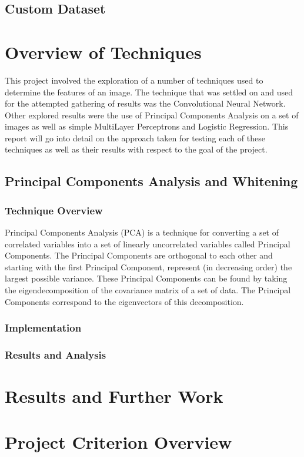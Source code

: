 \documentclass{article}
\begin{document}
\subsection{Custom Dataset}

\begin{enumerate}

\end{enumerate}

\section{Overview of Techniques}

This project involved the exploration of a number of techniques used to determine the features of an image. The technique that was settled
on and used for the attempted gathering of results was the Convolutional Neural Network. Other explored results were the use of Principal
Components Analysis on a set of images as well as simple MultiLayer Perceptrons and Logistic Regression. This report will go into detail on
the approach taken for testing each of these techniques as well as their results with respect to the goal of the project.

\subsection{Principal Components Analysis and Whitening}
  \subsubsection{Technique Overview}
  
  Principal Components Analysis (PCA) is a technique for converting a set of correlated variables into a set of linearly uncorrelated variables
  called Principal Components. The Principal Components are orthogonal to each other and starting with the first Principal Component, represent
  (in decreasing order) the largest possible variance. These Principal Components can be found by taking the eigendecomposition of the covariance
  matrix of a set of data. The Principal Components correspond to the eigenvectors of this decomposition.

  \subsubsection{Implementation}

  \subsubsection{Results and Analysis}





\section{Results and Further Work}

\section{Project Criterion Overview}
\end{document}
